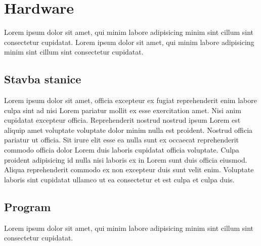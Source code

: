 \section{Hardware}
Lorem ipsum dolor sit amet, qui minim labore adipisicing minim sint cillum sint consectetur cupidatat. Lorem ipsum dolor sit amet, qui minim labore adipisicing minim sint cillum sint consectetur cupidatat.
\subsection{Stavba stanice}
Lorem ipsum dolor sit amet, officia excepteur ex fugiat reprehenderit enim labore culpa sint ad nisi Lorem pariatur mollit ex esse exercitation amet. Nisi anim cupidatat excepteur officia. Reprehenderit nostrud nostrud ipsum Lorem est aliquip amet voluptate voluptate dolor minim nulla est proident. Nostrud officia pariatur ut officia. Sit irure elit esse ea nulla sunt ex occaecat reprehenderit commodo officia dolor Lorem duis laboris cupidatat officia voluptate. Culpa proident adipisicing id nulla nisi laboris ex in Lorem sunt duis officia eiusmod. Aliqua reprehenderit commodo ex non excepteur duis sunt velit enim. Voluptate laboris sint cupidatat ullamco ut ea consectetur et est culpa et culpa duis.
\subsection{Program}
Lorem ipsum dolor sit amet, qui minim labore adipisicing minim sint cillum sint consectetur cupidatat.
